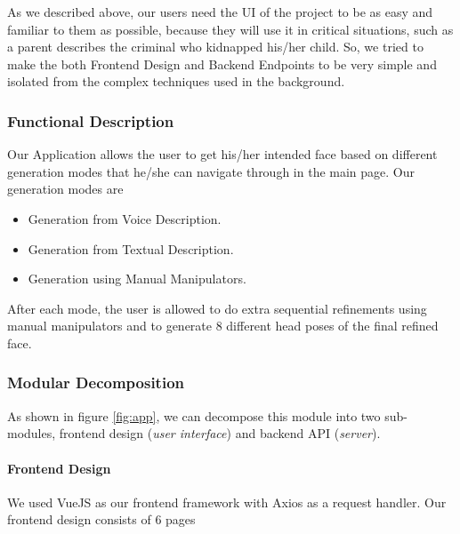 As we described above, our users need the UI of the project to be as easy and familiar to them as possible, because they will use it in critical situations, such as a parent describes the criminal who kidnapped his/her child. So, we tried to make the both Frontend Design and Backend Endpoints to be very simple and isolated from the complex techniques used in the background.

\subsubsection{Functional Description}
Our Application allows the user to get his/her intended face based on different generation modes that he/she can navigate through in the main page. Our generation modes are
\begin{itemize}
    \item Generation from Voice Description.
    \item Generation from Textual Description.
    \item Generation using Manual Manipulators.
\end{itemize}
After each mode, the user is allowed to do extra sequential refinements using manual manipulators and to generate 8 different head poses of the final refined face.

\subsubsection{Modular Decomposition}
As shown in figure \ref{fig:app}, we can decompose this module into two sub-modules, frontend design (\emph{user interface}) and backend API (\emph{server}).

\paragraph{Frontend Design}
We used VueJS as our frontend framework with Axios as a request handler. Our frontend design consists of 6 pages

